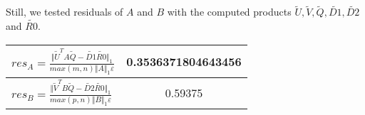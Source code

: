 \begin{example}
{\begin{enumerate}[(1).]
Still, we tested residuals of $A$ and $B$ with the computed products $\tilde{U}, \tilde{V}, \tilde{Q}, \tilde{D1}, \tilde{D2}$ and $\tilde{R0}$.

\begin{center}
	\bgroup
	\def\arraystretch{2}%
		\begin{tabular}{| m{}|| c |}
			\hline
    			$res_{A} = \frac{\Vert \tilde{U}^TA\tilde{Q} - \tilde{D1}\tilde{R0}\Vert_1}{max(m,n)\Vert A \Vert_1 \varepsilon}$ & 0.3536371804643456 \\ \hline
				$res_{B} = \frac{\Vert \tilde{V}^TB\tilde{Q} - \tilde{D2}\tilde{R0}\Vert_1}{max(p,n)\Vert B \Vert_1 \varepsilon}$ & 0.59375 \\ 
			\hline
		\end{tabular}
	\egroup
\end{center}
\end{enumerate}
} 
\end{example} 
    
